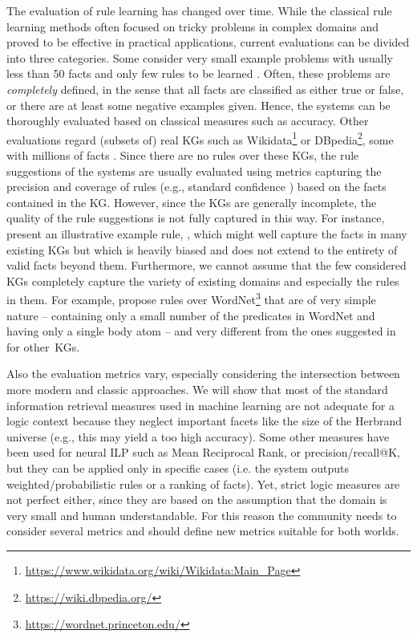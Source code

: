 \documentclass[letterpaper]{article} \usepackage{aaai20}  \usepackage{times}  \usepackage{helvet} \usepackage{courier}  \usepackage[hyphens]{url}  \usepackage{graphicx} \urlstyle{rm} \def\UrlFont{\rm}  \usepackage{graphicx}  \frenchspacing  \setlength{\pdfpagewidth}{8.5in}  \setlength{\pdfpageheight}{11in}  \usepackage{amsthm}
\theoremstyle{definition}
\newcommand{\citet}[1]{\citeauthor{#1} \shortcite{#1}}
\begin{document}
The evaluation of rule learning has changed over time.
While the classical rule learning methods often focused on tricky problems in complex domains  \cite{ILPdatasets,Quinlan-ML90:foil} and proved to be effective in practical applications, 
current evaluations can be divided into three categories. 
Some consider very small example problems with usually less than 50 facts and only few rules to be learned \cite{EGre-jair18:learning-explanatory-rules,RoR-NIPS17,minervini2019differentiable}. 
Often, these problems are \emph{completely} defined, in the sense that all facts are classified as either true or false, or there are at least some negative examples given.
Hence, the systems can be thoroughly evaluated based on classical measures such as accuracy.
Other evaluations regard (subsets of) real KGs such as Wikidata\footnote{\url{https://www.wikidata.org/wiki/Wikidata:Main_Page}}
or DBpedia\footnote{\url{https://wiki.dbpedia.org/}}, some with millions of facts
\cite{Galarraga+-VLDBJ15:amiep,OWaWa-IJCAI18:scalable-rule-learning,Ho+-ISWC18:guided-by-embedding,RDFRules}. Since there are no rules over these KGs, the rule suggestions of the systems are usually evaluated using metrics capturing the precision and coverage of rules (e.g., standard confidence \cite{Galarraga+-VLDBJ15:amiep})
based on the facts contained in the KG.
However, since the KGs are generally incomplete, the quality of the rule suggestions is not fully captured in this way. For instance, \citet{OWaWa-IJCAI18:scalable-rule-learning} present an illustrative example rule, 
,
which might well capture the facts in many existing KGs but which is heavily biased and does not extend to the entirety of valid facts beyond them.
Furthermore, we cannot assume that the few considered KGs completely capture the variety of existing domains and especially the rules in them. For example, \citet{Minervini+-NAMPI18:ntp-at-scale} propose rules over WordNet\footnote{\url{https://wordnet.princeton.edu/}} that are of very simple nature -- containing only a small number of the predicates in WordNet and having only a single body atom -- and very different from the ones suggested in \cite{Galarraga+-VLDBJ15:amiep} for other~KGs.


Also the evaluation metrics vary, especially considering the intersection between more modern and classic approaches. We will show that most of the standard information retrieval measures used in machine learning are not adequate for a logic context because they neglect important facets like the size of the Herbrand universe (e.g., this may yield a too high accuracy).
Some other measures have been used for neural ILP such as Mean Reciprocal Rank, or precision/recall@K, but they can be applied only in specific cases (i.e. the system outputs weighted/probabilistic rules or a ranking of facts).
Yet, strict logic measures are not perfect either, since they are based on the assumption that the domain is very small and human understandable. For this reason the community needs to consider several metrics and should define new metrics suitable for both worlds.
\end{document}
